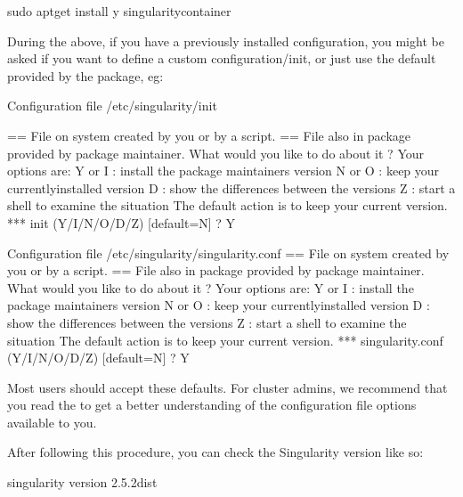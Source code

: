 \documentclass[letterpaper,10pt,english]{sphinxmanual}
\begin{document}
%
\begin{sphinxVerbatim}[commandchars=\\\{\}]
sudo apt\PYGZhy{}get install \PYGZhy{}y singularity\PYGZhy{}container
\end{sphinxVerbatim}

During the above, if you have a previously installed configuration, you might be
asked if you want to define a custom configuration/init, or just use the default
provided by the package, eg:

%
\begin{sphinxVerbatim}[commandchars=\\\{\}]
Configuration file \PYGZsq{}/etc/singularity/init\PYGZsq{}

  ==\PYGZgt{} File on system created by you or by a script.
  ==\PYGZgt{} File also in package provided by package maintainer.
    What would you like to do about it ?  Your options are:
      Y or I  : install the package maintainer\PYGZsq{}s version
      N or O  : keep your currently\PYGZhy{}installed version
        D     : show the differences between the versions
        Z     : start a shell to examine the situation
The default action is to keep your current version.
*** init (Y/I/N/O/D/Z) [default=N] ? Y

Configuration file \PYGZsq{}/etc/singularity/singularity.conf\PYGZsq{}
  ==\PYGZgt{} File on system created by you or by a script.
  ==\PYGZgt{} File also in package provided by package maintainer.
    What would you like to do about it ?  Your options are:
      Y or I  : install the package maintainer\PYGZsq{}s version
      N or O  : keep your currently\PYGZhy{}installed version
        D     : show the differences between the versions
        Z     : start a shell to examine the situation
The default action is to keep your current version.
*** singularity.conf (Y/I/N/O/D/Z) [default=N] ? Y
\end{sphinxVerbatim}

Most users should accept these defaults. For cluster admins, we recommend that
you read the  to
get a better understanding of the configuration file options available to you.

After following this procedure, you can check the Singularity version like so:

%
\begin{sphinxVerbatim}[commandchars=\\\{\}]
\PYGZdl{} singularity \PYGZhy{}\PYGZhy{}version
    2.5.2\PYGZhy{}dist
\end{sphinxVerbatim}
\end{document}
